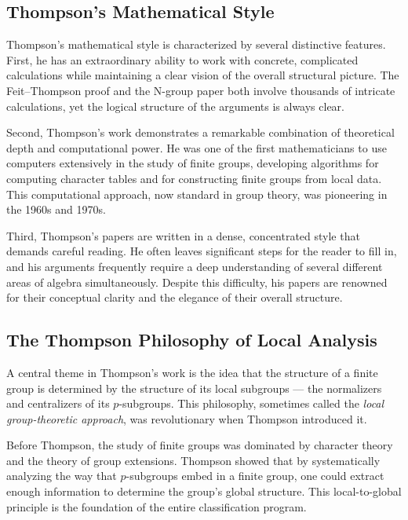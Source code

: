 \subsection{Thompson's Mathematical Style}

Thompson's mathematical style is characterized by several distinctive features. First, he has an extraordinary ability to work with concrete, complicated calculations while maintaining a clear vision of the overall structural picture. The Feit--Thompson proof and the N-group paper both involve thousands of intricate calculations, yet the logical structure of the arguments is always clear.

Second, Thompson's work demonstrates a remarkable combination of theoretical depth and computational power. He was one of the first mathematicians to use computers extensively in the study of finite groups, developing algorithms for computing character tables and for constructing finite groups from local data. This computational approach, now standard in group theory, was pioneering in the 1960s and 1970s.

Third, Thompson's papers are written in a dense, concentrated style that demands careful reading. He often leaves significant steps for the reader to fill in, and his arguments frequently require a deep understanding of several different areas of algebra simultaneously. Despite this difficulty, his papers are renowned for their conceptual clarity and the elegance of their overall structure.

\subsection{The Thompson Philosophy of Local Analysis}

A central theme in Thompson's work is the idea that the structure of a finite group is determined by the structure of its local subgroups --- the normalizers and centralizers of its \(p\)-subgroups. This philosophy, sometimes called the \textit{local group-theoretic approach}, was revolutionary when Thompson introduced it.

Before Thompson, the study of finite groups was dominated by character theory and the theory of group extensions. Thompson showed that by systematically analyzing the way that \(p\)-subgroups embed in a finite group, one could extract enough information to determine the group's global structure. This local-to-global principle is the foundation of the entire classification program.

